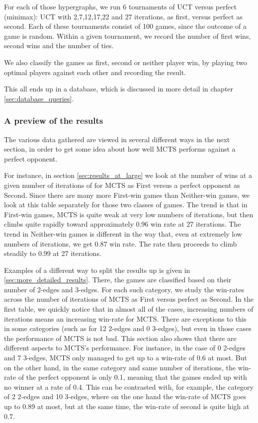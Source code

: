 For each of those hypergraphs, we run 6 tournaments of UCT versus perfect (minimax): UCT with 2,7,12,17,22 and 27 iterations, as first, versus perfect as second.
Each of these tournaments consist of 100 games, since the outcome of a game is random. Within a given tournament, we record the number of first wins, second wins and the number of ties.

We also classify the games as first, second or neither player win, by playing two optimal players against each other and recording the result.

This all ends up in a database, which is discussed in more detail in chapter \ref{sec:database_queries}.

\subsubsection{A preview of the results}

The various data gathered are viewed in several different ways in the next section, in order to get some idea about how well MCTS performs against a perfect opponent.

For instance, in section \ref{sec:results_at_large} we look at the number of wins at a given number of iterations of for MCTS as First versus a perfect opponent as Second. Since there are many more First-win games than Neither-win games, we look at this table separately for those two classes of games. The trend is that in First-win games, MCTS is quite weak at very low numbers of iterations, but then climbs quite rapidly toward approximately 0.96 win rate at 27 iterations. The trend in Neither-win games is different in the way that, even at extremely low numbers of iterations, we get 0.87 win rate. The rate then proceeds to climb steadily to 0.99 at 27 iterations.

Examples of a different way to split the results up is given in \ref{sec:more_detailed_results}.
There, the games are classified based on their number of 2-edges and 3-edges. For each such category, we study the win-rates across the number of iterations of MCTS as First versus perfect as Second.
In the first table, we quickly notice that in almost all of the cases, increasing numbers of iterations means an increasing win-rate for MCTS. There are exceptions to this in some categories (such as for 12 2-edges and 0 3-edges), but even in those cases the performance of MCTS is not bad.
This section also shows that there are different aspects to MCTS's performance. For instance, in the case of 0 2-edges and 7 3-edges, MCTS only managed to get up to a win-rate of 0.6 at most. But on the other hand, in the same category and same number of iterations, the win-rate of the perfect opponent is only 0.1, meaning that the games ended up with no winner at a rate of 0.4. This can be contrasted with, for example, the category of 2 2-edges and 10 3-edges, where on the one hand the win-rate of MCTS goes up to 0.89 at most, but at the same time, the win-rate of second is quite high at 0.7.
